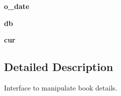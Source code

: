 \begin{DoxyCompactItemize}
\item 
\hypertarget{classadd__edit_1_1add__edit_a449b79bf213f43a7c0a963a376e74efc}{
{\bfseries o\_\-date}}
\label{classadd__edit_1_1add__edit_a449b79bf213f43a7c0a963a376e74efc}

\item 
\hypertarget{classadd__edit_1_1add__edit_a71ed8b6dac44b0325bf57f742a541553}{
{\bfseries db}}
\label{classadd__edit_1_1add__edit_a71ed8b6dac44b0325bf57f742a541553}

\item 
\hypertarget{classadd__edit_1_1add__edit_aeeed74057fa8e1fc4bf4fad430fc2fb8}{
{\bfseries cur}}
\label{classadd__edit_1_1add__edit_aeeed74057fa8e1fc4bf4fad430fc2fb8}

\end{DoxyCompactItemize}


\subsection{Detailed Description}
\begin{DoxyVerb}Interface to manipulate book details.
\end{DoxyVerb}
 

